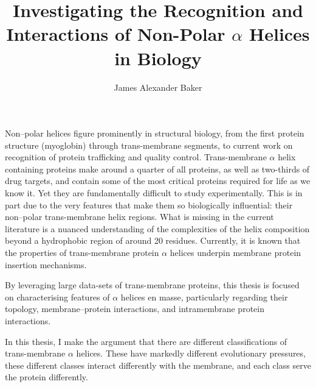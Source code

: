 \documentclass[12pt,PhD,twoside]{muthesis}
\begin{document}
\sloppy

\title{Investigating the Recognition and Interactions of Non-Polar \(\alpha\) Helices in Biology}
\author{James Alexander Baker}
\def\wordcount{22,000}






\beforeabstract{} %


Non\---polar helices figure prominently in structural biology, from the first protein structure (myoglobin) through trans-membrane segments, to current work on recognition of protein trafficking and quality control. Trans-membrane \(\alpha\) helix containing proteins make around a quarter of all proteins, as well as two-thirds of drug targets, and contain some of the most critical proteins required for life as we know it. Yet they are fundamentally difficult to study experimentally. This is in part due to the very features that make them so biologically influential: their non\---polar trans-membrane helix regions. What is missing in the current literature is a nuanced understanding of the complexities of the helix composition beyond a hydrophobic region of around 20 residues. Currently, it is known that the properties of trans-membrane protein \(\alpha\) helices underpin membrane protein insertion mechanisms.

By leveraging large data-sets of trans-membrane proteins, this thesis is focused on characterising features of \(\alpha\) helices en masse, particularly regarding their topology, membrane\---protein interactions, and intramembrane protein interactions.

In this thesis, I make the argument that there are different classifications of trans-membrane \(\alpha\) helices. These have markedly different evolutionary pressures, these different classes interact differently with the membrane, and each class serve the protein differently.
\end{document}
